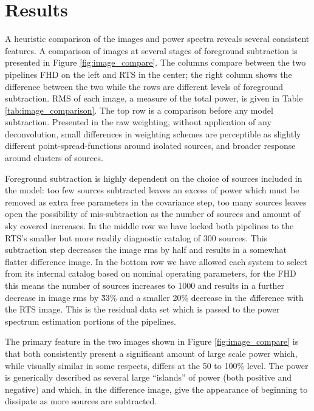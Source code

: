 \documentclass[preprint]{aastex}
\begin{document}
\section{Results}
\label{sec:results}
A heuristic comparison of the images and power spectra reveals several consistent features. A comparison of images at several stages of foreground subtraction is presented in Figure \ref{fig:image_compare}. The columns compare between the two pipelines FHD on the left and RTS in the center; the right column shows the difference between the two while the rows are different levels of foreground subtraction. RMS of  each image, a measure of the total power, is given in Table \ref{tab:image_comparison}.  The top row is a comparison before any model subtraction. Presented in the raw weighting, without application of any deconvolution, small differences in weighting schemes are perceptible as slightly different point-spread-functions around isolated sources, and broader response around clusters of sources.  

Foreground subtraction is highly dependent on the choice of sources included in the model: too few sources subtracted leaves an excess of power which must be removed as extra free parameters in the covariance step, too many sources leaves open the possibility of mis-subtraction as the number of sources and amount of sky covered increases. In the middle row we have locked both pipelines to the RTS's smaller but more readily diagnostic catalog of 300 sources.  This subtraction step decreases the image rms by half and results in a somewhat flatter difference image.  In the bottom row we have allowed each system to select from its internal catalog based on nominal operating parameters, for the FHD this means the number of sources increases to 1000 and results in a further decrease in image rms by \~33\% and a smaller 20\% decrease in the {\emph difference} with the RTS image.   This is the residual data set which is passed to the power spectrum estimation portions of the pipelines.

   The primary feature in the two images shown in Figure \ref{fig:image_compare} is that both consistently present a significant amount of large scale power which, while visually similar in some respects, differs at the 50 to 100\% level.  The power is generically described as several large ``islands'' of power (both positive and negative) and which, in the difference image, give the appearance of beginning to dissipate as more sources are subtracted.  
\end{document}
